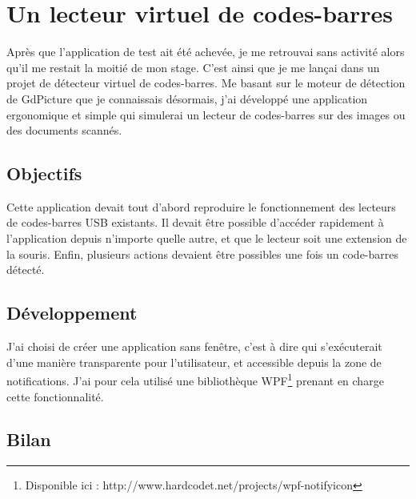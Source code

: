 \chapter{Un lecteur virtuel de codes-barres}

Après que l'application de test ait été achevée, je me retrouvai sans activité alors qu'il me restait la moitié de mon stage.
C'est ainsi que je me lançai dans un projet de détecteur virtuel de codes-barres.
Me basant sur le moteur de détection de GdPicture que je connaissais désormais, j'ai développé une application ergonomique et simple qui simulerai un lecteur de codes-barres sur des images ou des documents scannés.

\section{Objectifs}

Cette application devait tout d'abord reproduire le fonctionnement des lecteurs de codes-barres USB existants.
Il devait être possible d'accéder rapidement à l'application depuis n'importe quelle autre, et que le lecteur soit une extension de la souris.
Enfin, plusieurs actions devaient être possibles une fois un code-barres détecté.

\section{Développement}

J'ai choisi de créer une application sans fenêtre, c'est à dire qui s'exécuterait d'une manière transparente pour l'utilisateur, et accessible depuis la zone de notifications.
J'ai pour cela utilisé une bibliothèque WPF\footnote{Disponible ici : http://www.hardcodet.net/projects/wpf-notifyicon} prenant en charge cette fonctionnalité.


\section{Bilan}